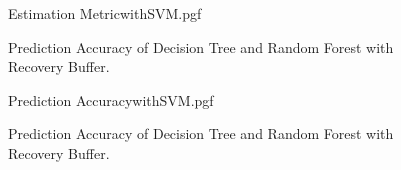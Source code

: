\documentclass[letterpaper, 10 pt, conference]{ieeeconf}  %
\begin{document}
\newpage

\begin{figure}[!htb]
	\begin{center}
		{Estimation MetricwithSVM.pgf}
	\end{center}
	\caption[Prediction Accuracy of Decision Tree and Random Forest with Recovery Buffer]{Prediction Accuracy of Decision Tree and Random Forest with Recovery Buffer.}
	\label{fig:Summary Estimation Accuracy EKF-ignore DT and RF and SVM with Recovery Buffer}
\end{figure}

\begin{figure}[!htb]
	\begin{center}
		{Prediction AccuracywithSVM.pgf}
	\end{center}
	\caption[Prediction Accuracy of Decision Tree and Random Forest with Recovery Buffer]{Prediction Accuracy of Decision Tree and Random Forest with Recovery Buffer.}
	\label{fig:Summary Prediction Accuracy EKF-ignore DT and RF and SVM with Recovery Buffer}
\end{figure}

\printbibliography[heading=bibintoc]




\end{document}
